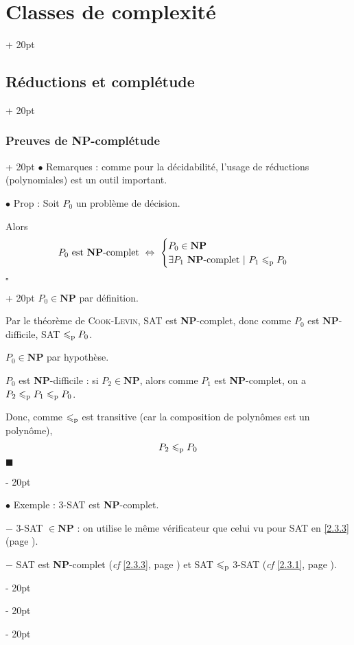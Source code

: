 \documentclass[a4paper, 12pt, twoside]{article}
\newcommand{\ssi}{\ \Leftrightarrow \ }
\renewcommand{\le}{\leqslant}
\newcommand{\ind}[1][20pt]{\advance\leftskip + #1}
\newcommand{\deind}[1][20pt]{\advance\leftskip - #1}
\newenvironment{indt}[2][20pt]{#2 \par \ind[#1]}{\par \deind} %
\newenvironment{proof}[1][{}]{\begin{indt}{$\square$ #1}}{$\blacksquare$ \end{indt}}
\begin{document}
\begin{indt}{\section{Classes de complexité}}
\begin{indt}{\subsection{Réductions et complétude}}
\begin{indt}{\subsubsection{Preuves de \textbf{NP}-complétude}}
                $\bullet$ Remarques : comme pour la décidabilité, l'usage de réductions (polynomiales) est un outil important.

                \vspace{12pt}
                
                $\bullet$ Prop : Soit $P_0$ un problème de décision.

                Alors
                \[
                    P_0\ \text{est \textbf{NP}-complet}
                    \ssi
                    \begin{cases}
                        P_0 \in \mathbf{NP}
                        \\
                        \exists P_1 \ \text{\textbf{NP}-complet}\ |\ P_1 \le_{\rm p} P_0
                    \end{cases}
                \]

                \begin{proof}
                    \boxed{\Rightarrow} $P_0 \in \mathbf{NP}$ par définition.

                    Par le théorème de \textsc{Cook-Levin}, SAT est \textbf{NP}-complet, donc comme $P_0$ est $\mathbf{NP}$- difficile, SAT $\le_{\rm p} P_0$.

                    \vspace{6pt}
                    
                    \boxed{\Leftarrow} $P_0 \in \mathbf{NP}$ par hypothèse.

                    $P_0$ est \textbf{NP}-difficile : si $P_2 \in \mathbf{NP}$, alors comme $P_1$ est \textbf{NP}-complet, on a $P_2 \le_{\rm p} P_1 \le_{\rm p} P_0$.

                    Donc, comme $\le_{\rm p}$ est transitive (car la composition de polynômes est un polynôme),
                    \[
                        P_2 \le_{\rm p} P_0
                    \]
                \end{proof}

                \vspace{12pt}
                
                $\bullet$ Exemple : 3-SAT est \textbf{NP}-complet.

                $-$ 3-SAT $\in \mathbf{NP}$ : on utilise le même vérificateur que celui vu pour SAT en \ref{2.3.3} (page \pageref{2.3.3}).

                $-$ SAT est \textbf{NP}-complet (\textit{cf} \ref{2.3.3}, page \pageref{2.3.3}) et SAT $\le_{\rm p}$ 3-SAT (\textit{cf} \ref{2.3.1}, page \pageref{2.3.1}).


\end{indt}
\end{indt}
\end{indt}
\end{document}
